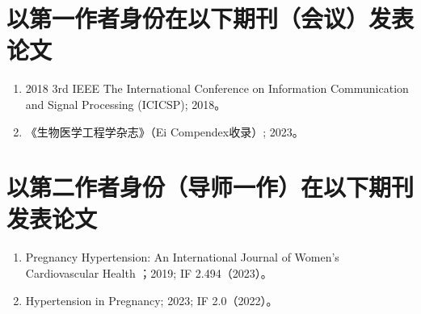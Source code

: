 \cleardoublepage
{}

{%
    \section*{以第一作者身份在以下期刊（会议）发表论文}
    \begin{enumerate}
        \item 2018 3rd IEEE The International Conference on Information Communication and Signal Processing (ICICSP); 2018。
        \item 《生物医学工程学杂志》（Ei Compendex收录）; 2023。
    \end{enumerate}

    \section*{以第二作者身份（导师一作）在以下期刊发表论文}
    \begin{enumerate}
        \item Pregnancy Hypertension: An International Journal of Women's Cardiovascular Health ；2019; IF 2.494（2023）。
        \item Hypertension in Pregnancy; 2023; IF 2.0（2022）。
    \end{enumerate}
}
